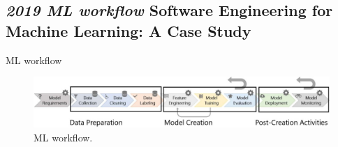 \documentclass{beamer}
\begin{document}
\subsection{\textit{2019 ML workflow} Software Engineering for Machine Learning: A Case Study}
\begin{frame}{ML workflow}
    \begin{figure}
        \centering
        \includegraphics[width = \linewidth]{Monitoring/MLworkflow.jpg}
        \caption{ML workflow.}
    \end{figure}
\end{frame}
\end{document}

